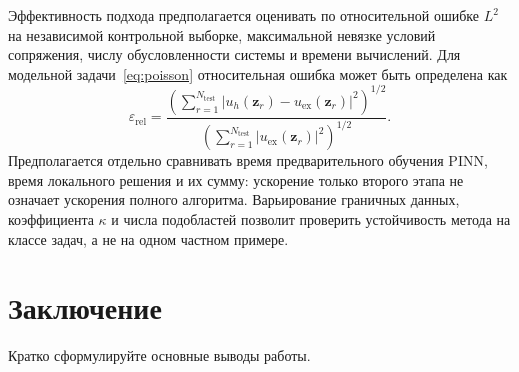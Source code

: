 \documentclass{misisarticle}
\begin{document}
Эффективность подхода предполагается оценивать по относительной ошибке $L^2$ на независимой контрольной выборке, максимальной невязке условий сопряжения, числу обусловленности системы и времени вычислений. Для модельной задачи~\eqref{eq:poisson} относительная ошибка может быть определена как
\begin{equation}
 \varepsilon_{\mathrm{rel}}=
 \frac{\left(\sum_{r=1}^{N_{\mathrm{test}}}
 |u_h(\mathbf z_r)-u_{\mathrm{ex}}(\mathbf z_r)|^2\right)^{1/2}}
 {\left(\sum_{r=1}^{N_{\mathrm{test}}}
 |u_{\mathrm{ex}}(\mathbf z_r)|^2\right)^{1/2}}.
\label{eq:relativeerror}
\end{equation}
Предполагается отдельно сравнивать время предварительного обучения PINN, время локального решения и их сумму: ускорение только второго этапа не означает ускорения полного алгоритма. Варьирование граничных данных, коэффициента $\kappa$ и числа подобластей позволит проверить устойчивость метода на классе задач, а не на одном частном примере.

\section{Заключение}

Кратко сформулируйте основные выводы работы.
\end{document}
